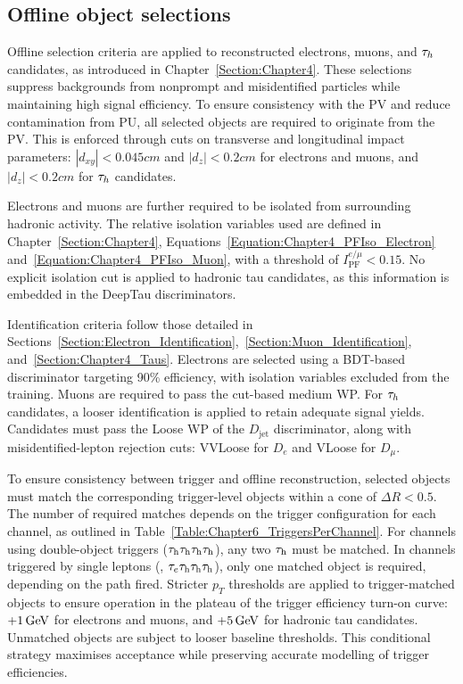 \subsection{Offline object selections}
\label{Section:Chapter6_ObjectSelection}

Offline selection criteria are applied to reconstructed electrons, muons, and $\tau_h$candidates, as introduced in Chapter~\ref{Section:Chapter4}. These selections suppress backgrounds from nonprompt and misidentified particles while maintaining high signal efficiency. To ensure consistency with the \ac{PV} and reduce contamination from \ac{PU}, all selected objects are required to originate from the \ac{PV}. This is enforced through cuts on transverse and longitudinal impact parameters: $|d_{xy}| < 0.045\unit{cm}$ and $|d_z| < 0.2\unit{cm}$ for electrons and muons, and $|d_z| < 0.2\unit{cm}$ for $\tau_h$ candidates.

Electrons and muons are further required to be isolated from surrounding hadronic activity. The relative isolation variables used are defined in Chapter~\ref{Section:Chapter4}, Equations~\ref{Equation:Chapter4_PFIso_Electron} and~\ref{Equation:Chapter4_PFIso_Muon}, with a threshold of $I^{e/\mu}_\text{PF} < 0.15$. No explicit isolation cut is applied to hadronic tau candidates, as this information is embedded in the DeepTau discriminators.

Identification criteria follow those detailed in Sections~\ref{Section:Electron_Identification},~\ref{Section:Muon_Identification}, and~\ref{Section:Chapter4_Taus}. Electrons are selected using a BDT-based discriminator targeting 90\% efficiency, with isolation variables excluded from the training. Muons are required to pass the cut-based medium \ac{WP}. For $\tau_h$ candidates, a looser identification is applied to retain adequate signal yields. Candidates must pass the Loose \ac{WP} of the $D_{\text{jet}}$ discriminator, along with misidentified-lepton rejection cuts: VVLoose for $D_e$ and VLoose for $D_\mu$. 

To ensure consistency between trigger and offline reconstruction, selected objects must match the corresponding trigger-level objects within a cone of $\Delta R < 0.5$. The number of required matches depends on the trigger configuration for each channel, as outlined in Table~\ref{Table:Chapter6_TriggersPerChannel}. For channels using double-object triggers (\eg $\tau_\mathrm{h}\tau_\mathrm{h}\tau_\mathrm{h}\tau_\mathrm{h}$), any two $\tau_\mathrm{h}$ must be matched. In channels triggered by single leptons (\eg, $\tau_e\tau_\mathrm{h}\tau_\mathrm{h}\tau_\mathrm{h}$), only one matched object is required, depending on the path fired. Stricter $p_T$ thresholds are applied to trigger-matched objects to ensure operation in the plateau of the trigger efficiency turn-on curve: $+1\,\text{Ge\hspace{-.08em}V}$ for electrons and muons, and $+5\,\text{Ge\hspace{-.08em}V}$ for hadronic tau candidates. Unmatched objects are subject to looser baseline thresholds. This conditional strategy maximises acceptance while preserving accurate modelling of trigger efficiencies.

